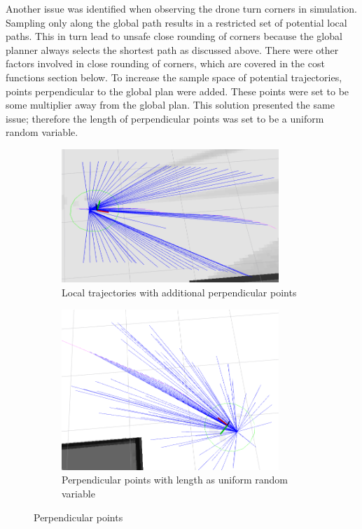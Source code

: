 \documentclass[capstone_report.tex]{subfiles}
\begin{document}
Another issue was identified when observing the drone turn corners in simulation.  Sampling only along the global path results in a restricted set of potential local paths.  This in turn lead to unsafe close rounding of corners because the global planner always selects the shortest path as discussed above.  There were other factors involved in close rounding of corners, which are covered in the cost functions section below.  To increase the sample space of potential trajectories, points perpendicular to the global plan were added.  These points were set to be some multiplier away from the global plan.  This solution presented the same issue; therefore the length of perpendicular points was set to be a uniform random variable.

\begin{figure}[H]
    \centering
    \begin{subfigure}{0.5\textwidth}
        \centering
        \includegraphics[width=0.9\textwidth]{imgs/local_traj_gen_perp.png}
        \caption{Local trajectories with additional perpendicular points}
    \end{subfigure}%
    \begin{subfigure}{0.5\textwidth}
        \centering
        \includegraphics[width=0.9\textwidth]{imgs/local_traj_gen_random.png}
        \caption{Perpendicular points with length as uniform random variable}
    \end{subfigure}
    \caption{Perpendicular points\label{fig:local_traj_gen_perp}}
\end{figure}
\end{document}
